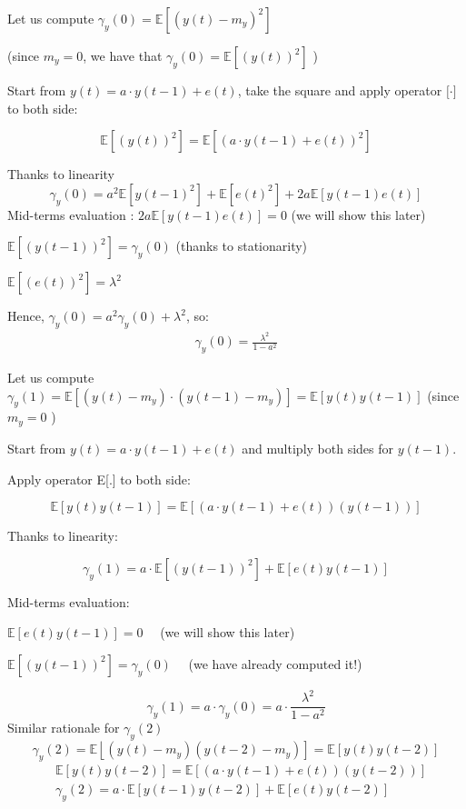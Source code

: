 Let us compute $\gamma_{y}(0)=\mathbb{E}\left[\left(y(t)-m_{y}\right)^{2}\right]$

(since $m_{y}=0$, we have that $\gamma_{y}(0)=\mathbb{E}\left[(y(t))^{2}\right]$ )

Start from $y(t)=a \cdot y(t-1)+e(t)$, take the square and apply operator $\mathbb[\cdot]$ to both side:

$$
\mathbb{E}\left[(y(t))^{2}\right]=\mathbb{E}\left[(a \cdot y(t-1)+e(t))^{2}\right]
$$

Thanks to linearity
$$
\gamma_{y}(0)=a^{2} \mathbb{E}\left[y(t-1)^{2}\right]+\mathbb{E}\left[e(t)^{2}\right]+2 a \mathbb{E}[y(t-1) e(t)]
$$
Mid-terms evaluation :
$2 a \mathbb{E}[y(t-1) e(t)]=0$ (we will show this later)

$\mathbb{E}\left[(y(t-1))^{2}\right]=\gamma_{y}(0)$ (thanks to stationarity)

$\mathbb{E}\left[(e(t))^{2}\right]=\lambda^{2}$

Hence, $\gamma_{y}(0)=a^{2} \gamma_{y}(0)+\lambda^{2}$, so:
\begin{align*}
	\gamma_{y}(0)=\frac{\lambda^{2}}{1-a^{2}}
\end{align*} 

Let us compute $\gamma_{y}(1)=\mathbb{E}\left[\left(y(t)-m_{y}\right) \cdot\left(y(t-1)-m_{y}\right)\right]=\mathbb{E}[y(t) y(t-1)]$ (since $m_{y}=0$ )

Start from $y(t)=a \cdot y(t-1)+e(t)$ and multiply both sides for $y(t-1)$.

Apply operator E[.] to both side:

$$\mathbb{E}[y(t) y(t-1)]=\mathbb{E}[(a \cdot y(t-1)+e(t))(y(t-1))]$$

Thanks to linearity:

$$\gamma_{y}(1)=a \cdot \mathbb{E}\left[(y(t-1))^{2}\right]+\mathbb{E}[e(t) y(t-1)]$$

Mid-terms evaluation:

$\mathbb{E}[e(t) y(t-1)]=0 \quad$ (we will show this later)

$\mathbb{E}\left[(y(t-1))^{2}\right]=\gamma_{y}(0) \quad$ (we have already computed it!)

$$
\gamma_{y}(1)=a \cdot \gamma_{y}(0)=a \cdot \frac{\lambda^{2}}{1-a^{2}}
$$
Similar rationale for $\gamma_{y}(2)$
$$
\gamma_{y}(2)=\mathbb{E}\left\lfloor\left(y(t)-m_{y}\right)\left(y(t-2)-m_{y}\right)\right]=\mathbb{E}[y(t) y(t-2)]
$$
\begin{align*}
	&\mathbb{E}[y(t) y(t-2)]=\mathbb{E}[(a \cdot y(t-1)+e(t))(y(t-2))] \\
	&\gamma_{y}(2)=a \cdot \mathbb{E}[y(t-1) y(t-2)]+\mathbb{E}[e(t) y(t-2)]
\end{align*}

